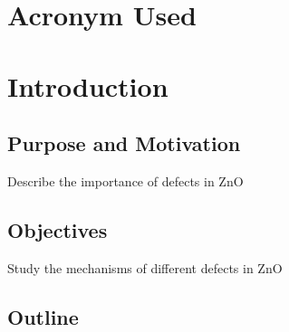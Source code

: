 \addchapheadtotoc
\chapter{Acronym Used}
\chapter{Introduction}
\section{Purpose and Motivation}
Describe the importance of defects in ZnO
\section{Objectives}
Study the mechanisms of different defects in ZnO
\section{Outline}

